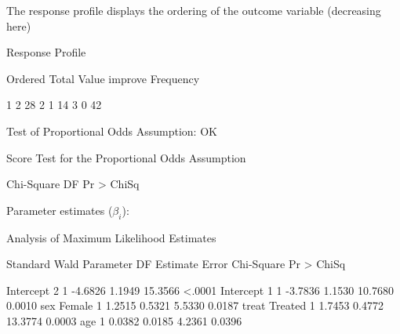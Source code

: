 \begin{frame}[fragile]
The response profile displays the ordering of the outcome variable (\alert{decreasing} here)
\begin{Output}[gobble=6,fontsize=\footnotesize,baselinestretch=0.8]
                                Response Profile
 
                       Ordered                      Total
                         Value      improve     Frequency

                             1            2            28
                             2            1            14
                             3            0            42
\end{Output}
Test of Proportional Odds Assumption: OK
\begin{Output}[gobble=6,fontsize=\footnotesize,baselinestretch=0.8]
                 Score Test for the Proportional Odds Assumption
 
                       Chi-Square       DF     Pr > ChiSq
\end{Output}
Parameter estimates ($\beta_i$):
\begin{Output}[gobble=2,fontsize=\footnotesize,baselinestretch=0.8]
                   Analysis of Maximum Likelihood Estimates
 
                                      Standard        Wald
  Parameter           DF   Estimate      Error    Chi-Square  Pr > ChiSq

  Intercept 2          1    -4.6826     1.1949      15.3566      <.0001
  Intercept 1          1    -3.7836     1.1530      10.7680      0.0010
  sex       Female     1     1.2515     0.5321       5.5330      0.0187
  treat     Treated    1     1.7453     0.4772      13.3774      0.0003
  age                  1     0.0382     0.0185       4.2361      0.0396
\end{Output}
\end{frame}


